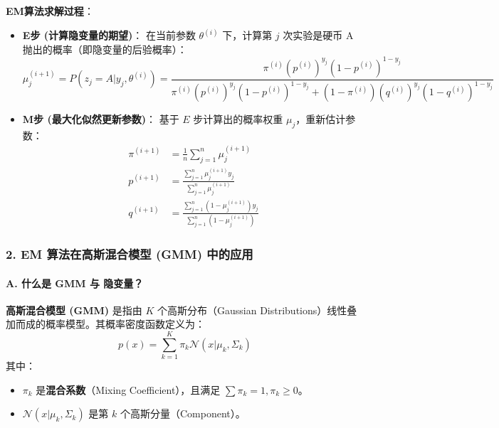 \documentclass[a4paper, 11pt]{ctexart}
\begin{document}
\textbf{EM算法求解过程}：
\begin{itemize}
    \item \textbf{E步 (计算隐变量的期望)}：
    在当前参数 $\theta^{(i)}$ 下，计算第 $j$ 次实验是硬币 A 抛出的概率（即隐变量的后验概率）：
    \begin{equation}
        \mu_j^{(i+1)} = P(z_j=A | y_j, \theta^{(i)}) = \frac{\pi^{(i)} (p^{(i)})^{y_j} (1-p^{(i)})^{1-y_j}}{\pi^{(i)} (p^{(i)})^{y_j} (1-p^{(i)})^{1-y_j} + (1-\pi^{(i)}) (q^{(i)})^{y_j} (1-q^{(i)})^{1-y_j}}
    \end{equation}
    
    \item \textbf{M步 (最大化似然更新参数)}：
    基于 $E$ 步计算出的概率权重 $\mu_j$，重新估计参数：
    \begin{equation}
        \begin{aligned}
        \pi^{(i+1)} &= \frac{1}{n} \sum_{j=1}^n \mu_j^{(i+1)} \\
        p^{(i+1)} &= \frac{\sum_{j=1}^n \mu_j^{(i+1)} y_j}{\sum_{j=1}^n \mu_j^{(i+1)}} \\
        q^{(i+1)} &= \frac{\sum_{j=1}^n (1-\mu_j^{(i+1)}) y_j}{\sum_{j=1}^n (1-\mu_j^{(i+1)})}
        \end{aligned}
    \end{equation}
\end{itemize}

\subsubsection{2. EM 算法在高斯混合模型 (GMM) 中的应用}

\paragraph{A. 什么是 GMM 与 隐变量？}

\textbf{高斯混合模型 (GMM)} 是指由 $K$ 个高斯分布（Gaussian Distributions）线性叠加而成的概率模型。其概率密度函数定义为：
\begin{equation}
    p(x) = \sum_{k=1}^K \pi_k \mathcal{N}(x | \mu_k, \Sigma_k)
\end{equation}
其中：
\begin{itemize}
    \item $\pi_k$ 是\textbf{混合系数}（Mixing Coefficient），且满足 $\sum \pi_k = 1, \pi_k \ge 0$。
    \item $\mathcal{N}(x | \mu_k, \Sigma_k)$ 是第 $k$ 个高斯分量（Component）。
\end{itemize}
\end{document}

